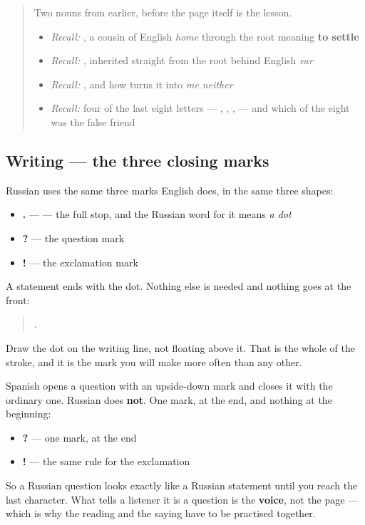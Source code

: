 \begin{quote}
Two nouns from earlier, before the page itself is the lesson.

\begin{itemize}
\raggedright
  \item \emph{Recall:} \emph{}, a cousin of English \emph{home} through the root meaning \textbf{to settle}
  \item \emph{Recall:} \emph{}, inherited straight from the root behind English \emph{ear}
  \item \emph{Recall:} \emph{}, and how \textbf{} turns it into \emph{me neither}
  \item \emph{Recall:} four of the last eight letters — \textbf{}, \textbf{}, \textbf{}, \textbf{} — and which of the eight was the false friend
\end{itemize}
\end{quote}

\subsection*{Writing — the three closing marks}
Russian uses the same three marks English does, in the same three shapes:

\begin{itemize}
\raggedright
  \item \textbf{.} — \textbf{} — the full stop, and the Russian word for it means \emph{a dot}
  \item \textbf{?} — the question mark
  \item \textbf{!} — the exclamation mark
\end{itemize}

A statement ends with the dot. Nothing else is needed and nothing goes at the front:

\begin{quote}
  .
\end{quote}

Draw the dot on the writing line, not floating above it. That is the whole of the stroke, and it is the mark you will make more often than any other.

\begin{grammarlens}[title={Grammar lens — Russian closes, and never opens}]
Spanish opens a question with an upside-down mark and closes it with the ordinary one. Russian does \textbf{not}. One mark, at the end, and nothing at the beginning:

\begin{itemize}
\raggedright
  \item \textbf{  ?} — one mark, at the end
  \item \textbf{!} — the same rule for the exclamation
\end{itemize}

So a Russian question looks exactly like a Russian statement until you reach the last character. What tells a listener it is a question is the \textbf{voice}, not the page — which is why the reading and the saying have to be practised together.
\end{grammarlens}

